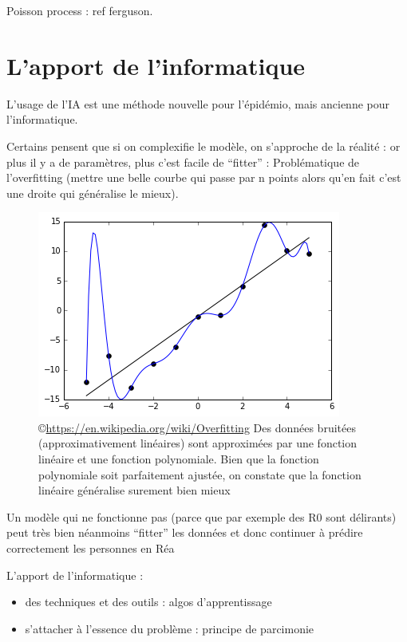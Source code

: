 \documentclass[review]{elsarticle}
\begin{document}
Poisson process : ref ferguson.


\section{L'apport de l'informatique}

L'usage de l'IA est une méthode nouvelle pour l'épidémio, mais ancienne pour l'informatique.


Certains pensent que si on complexifie le modèle, on s'approche de la réalité : or plus il y a de paramètres, plus c'est facile de ``fitter'' : Problématique de l'overfitting (mettre une belle courbe qui passe par n points alors qu'en fait c'est une droite qui généralise le mieux).


\begin{figure}[h]
  \includegraphics[width=0.8\linewidth]{Overfitted_Data.png}  
  \centering
  \caption{\copyright \href{wikipedia}{https://en.wikipedia.org/wiki/Overfitting}  Des données bruitées (approximativement linéaires) sont approximées par une fonction linéaire et une fonction polynomiale. Bien que la fonction polynomiale soit parfaitement ajustée, on constate que la fonction linéaire généralise surement bien mieux}
  \label{fig:overfitting}
\end{figure}


Un modèle qui ne fonctionne pas (parce que par exemple des R0 sont délirants) peut très bien néanmoins ``fitter'' les données  et donc continuer à prédire correctement les personnes en Réa


L'apport de l'informatique :
\begin{itemize}
\item des techniques et des outils : algos d'apprentissage
\item s'attacher à l'essence du problème : principe de parcimonie
\end{itemize}
\end{document}
